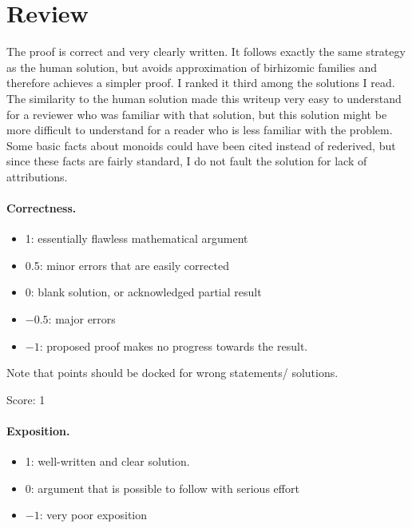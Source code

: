 \documentclass[11pt]{article}
\theoremstyle{definition}
\theoremstyle{remark}
\begin{document}
\maketitle

\section{Review}

The proof is correct and very clearly written.  It follows exactly the same strategy as the human solution, but avoids approximation of birhizomic families and therefore achieves a simpler proof.  I ranked it third among the solutions I read.  The similarity to the human solution made this writeup very easy to understand for a reviewer who was familiar with that solution, but this solution might be more difficult to understand for a reader who is less familiar with the problem.  Some basic facts about monoids could have been cited instead of rederived, but since these facts are fairly standard, I do not fault the solution for lack of attributions.

\paragraph{Correctness.}
\begin{itemize}
	\item  1: essentially flawless mathematical argument
	\item  0.5: minor errors that are easily corrected
	\item  0: blank solution, or acknowledged partial result
	\item  $-0.5$: major errors
	\item  $-1$: proposed proof makes no progress towards the result.
\end{itemize}
Note that points should be docked for wrong statements/ solutions.

\noindent Score: 1

\paragraph{Exposition.}
\begin{itemize}
	\item  1: well-written and clear solution.
	\item  0: argument that is possible to follow with serious effort
	\item  $-1$: very poor exposition
\end{itemize}
\end{document}
